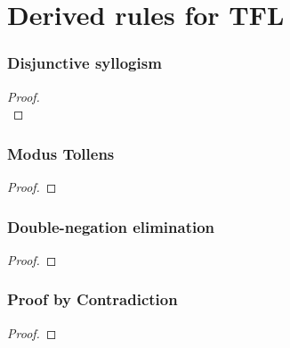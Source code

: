 \newpage
\section{Derived rules for TFL}
\begin{multicols}{2}
\subsubsection*{Disjunctive syllogism}
\begin{proof}

\\	
\end{proof}

%

\subsubsection*{Modus Tollens}

\begin{proof}
	 
\end{proof}

\subsubsection*{Double-negation elimination}
	\begin{proof}
	\end{proof}


\subsubsection*{Proof by Contradiction}
	\begin{proof}
		\open
			\ellipsesline
		\close
	\end{proof}




\end{multicols}
